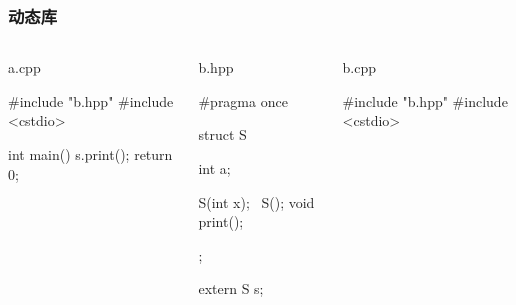 \documentclass[UTF8,lualatex]{ctexbeamer}
\begin{document}
\begin{frame}[fragile,t]
    \frametitle{动态库}
    \scriptsize
    \begin{columns}[t]
        \begin{column}{0.33\textwidth}
            \begin{block}{a.cpp}
                \begin{cppcode}
                #include "b.hpp"
                #include <cstdio>

                int main() {
                  s.print();
                  return 0;
                }
                \end{cppcode}
            \end{block}
        \end{column}
        \begin{column}{0.3\textwidth}
            \begin{block}{b.hpp}
                \begin{cppcode}
                #pragma once

                struct S
                {
                  int a;

                  S(int x);
                  ~S();
                  void print();
                };

                extern S s;
                \end{cppcode}
            \end{block}
        \end{column}
        \begin{column}{0.33\textwidth}
            \begin{block}{b.cpp}
                \begin{cppcode}
                #include "b.hpp"
                #include <cstdio>


\end{cppcode}
\end{block}
\end{column}
\end{columns}
\end{frame}
\end{document}

